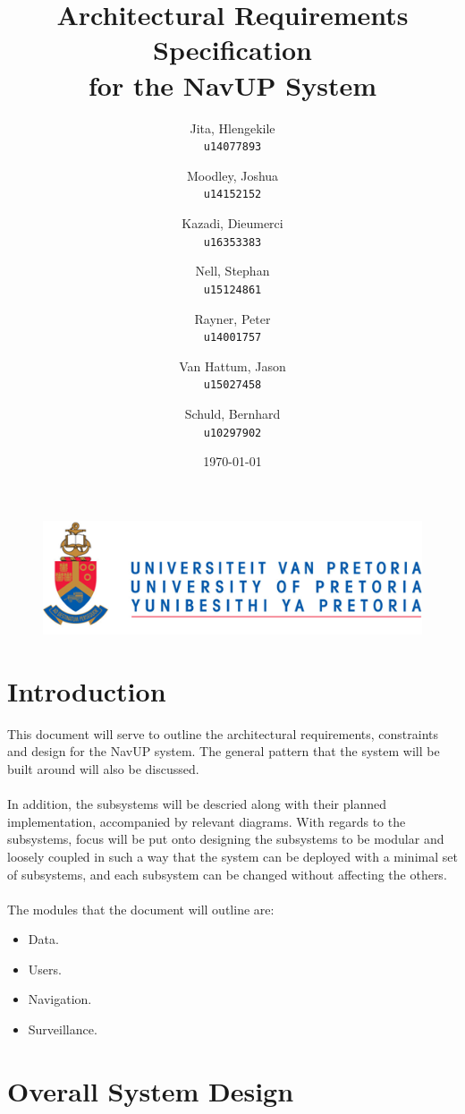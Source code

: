 \documentclass[english]{article}
\author{
    Jita, Hlengekile\\
    \texttt{u14077893}
    \and
    Moodley, Joshua\\
    \texttt{u14152152}
    \and
    Kazadi, Dieumerci\\
    \texttt{u16353383}
    \and
    Nell, Stephan\\
    \texttt{u15124861}
    \and
    Rayner, Peter\\
    \texttt{u14001757}
    \and
    Van Hattum, Jason\\
    \texttt{u15027458}
    \and
    Schuld, Bernhard\\
    \texttt{u10297902}
}
\title{Architectural Requirements Specification\\
    for the NavUP System\\
    }
\date{\today}
\begin{document}
    \fboxsep=2mm

    \maketitle
    \begin{figure}[!t]
        \includegraphics{up_logo.png}
    \end{figure}
    \newpage

    \tableofcontents
    \newpage



    \section{Introduction}
        This document will serve to outline the architectural requirements, constraints and design for the NavUP system. The general pattern that the system will be built around will also be discussed.\\
        \\
        In addition, the subsystems will be descried along with their planned implementation, accompanied by relevant diagrams. With regards to the subsystems, focus will be put onto designing the subsystems to be modular and loosely coupled in such a way that the system can be deployed with a minimal set of subsystems, and each subsystem can be changed without affecting the others.\\
        \\
        The modules that the document will outline are:
        \begin{itemize}
            \item Data.
            \item Users.
            \item Navigation.
            \item Surveillance.
        \end{itemize}

    \section{Overall System Design}
\end{document}
